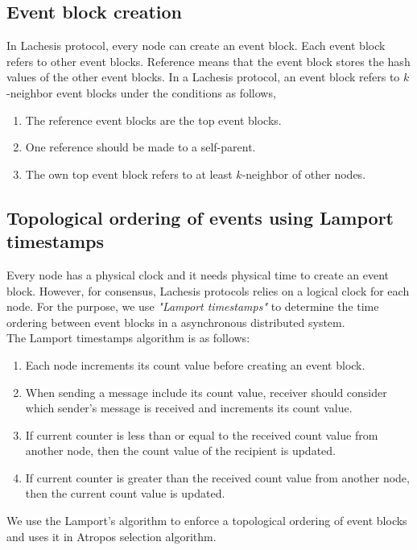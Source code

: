 \documentclass[preprint,12pt]{elsarticle}
\begin{document}
\subsection{Event block creation}
In Lachesis protocol, every node can create an event block. Each event block refers to other event blocks. Reference means that the event block stores the hash values of the other event blocks. In a Lachesis protocol, an event block refers to $k$-neighbor event blocks under the conditions as follows, 

\begin{enumerate}
    \item The reference event blocks are the top event blocks.
    \item One reference should be made to a self-parent.
    \item The own top event block refers to at least $k$-neighbor of other nodes.
\end{enumerate}

\subsection{Topological ordering of events using Lamport timestamps}
Every node has a physical clock and it needs physical time to create an event block. However, for consensus, Lachesis protocols relies on a logical clock for each node. For the purpose, we use \textit{"Lamport timestamps"} \cite{lamport1978time} to determine the time ordering between event blocks in a asynchronous distributed system.
\\
The Lamport timestamps algorithm is as follows:
\begin{enumerate}
	\item Each node increments its count value before creating an event block.
	\item When sending a message include its count value, receiver should consider which sender’s message is received and increments its count value.
	\item If current counter is less than or equal to the received count value from another node, then the count value of the recipient is updated.  
	\item If current counter is greater than the received count value from another node, then the current count value is updated.
\end{enumerate}
We use the Lamport's algorithm to enforce a topological ordering of event blocks and uses it in Atropos selection algorithm. 
\end{document}
